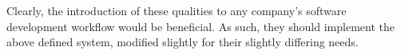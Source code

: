 \documentclass[12pt]{article}
\begin{document}
Clearly, the introduction of these qualities to any company's software development workflow would be beneficial. As such, they should implement the above defined system, modified slightly for their slightly differing needs.
\newpage



\newpage
\end{document}
